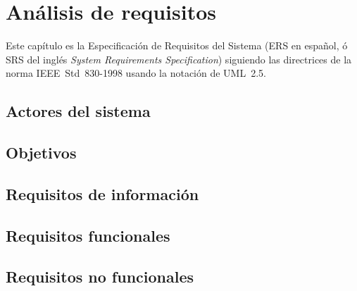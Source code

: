 
\chapter{Análisis de requisitos}

Este capítulo es la Especificación de Requisitos del Sistema (ERS en español, ó SRS del inglés \emph{System Requirements Specification}) siguiendo las directrices de la norma IEEE~Std~830-1998 \citep{std830-1998} usando la notación de UML~2.5. 

\section{Actores del sistema}


\section{Objetivos}

\section{Requisitos de información}

\section{Requisitos funcionales}

\section{Requisitos no funcionales}

